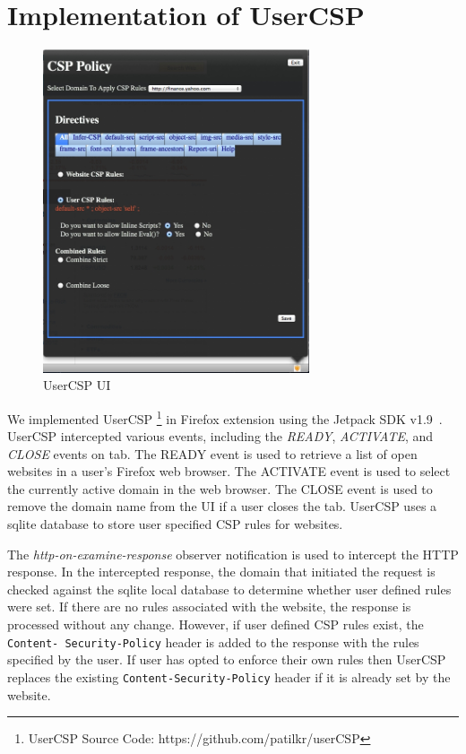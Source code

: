 \section {Implementation of UserCSP}
\label{sec:imp}

\begin{figure}[!ht]
\begin{center}
\includegraphics[width=0.7\textwidth]{UserCSP-ui}
\end{center}
\caption{UserCSP UI}
\label{fig:userCSP-ui}
\end{figure}

We implemented UserCSP \footnote[1]{UserCSP Source Code:
  https://github.com/patilkr/userCSP} in Firefox extension using the
Jetpack SDK v1.9~\cite{JetPack-SDK}. UserCSP intercepted various
events, including the {\it READY}, {\it ACTIVATE}, and {\it CLOSE} events on
tab. The READY event is used to retrieve a list of open websites in a
user's Firefox web browser. The ACTIVATE event is used to select the
currently active domain in the web browser.  The CLOSE event is used
to remove the domain name from the UI if a user closes the
tab. UserCSP uses a sqlite database to store user specified CSP rules
for websites.

The {\it http-on-examine-response} observer notification is used to
intercept the HTTP response. In the intercepted response, the domain
that initiated the request is checked against the sqlite local
database to determine whether user defined rules were set. If there
are no rules associated with the website, the response is processed
without any change.  However, if user defined CSP rules exist, the
{\tt Content- Security-Policy} header is added to the response with
the rules specified by the user. If user has opted to enforce their
own rules then UserCSP replaces the existing {\tt Content-Security-Policy} header if it is already set by the website.

